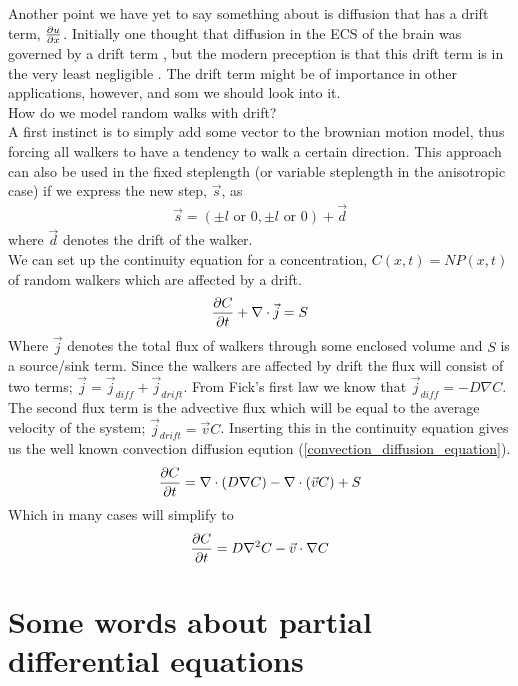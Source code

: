 Another point we have yet to say something about is diffusion that has a drift term, $\frac{\partial u}{\partial x}$. 
Initially one thought that diffusion in the ECS of the brain was governed by a drift term , but the modern preception is that this drift term is in the very least negligible \cite{nicholson2001diffusion}.
The drift term might be of importance in other applications, however, and som we should look into it.\\
How do we model random walks with drift? \\
A first instinct is to simply add some vector to the brownian motion model, thus forcing all walkers to have a tendency to walk a certain direction. 
This approach can also be used in the fixed steplength (or variable steplength in the anisotropic case)  if we express the new step, $\vec{s}$, as
\begin{align*}
 \vec{s} = (\pm l \text{ or }0,\pm l \text{ or }0) +\vec{d}
\end{align*}
where $\vec{d}$ denotes the drift of the walker.\\
We can set up the continuity equation for a concentration, $C(x,t) = NP(x,t)$ of random walkers which are affected by a drift.
\begin{equation}
 \frac{\partial C}{\partial t} +\nabla\cdot\vec{j} = S
\end{equation}
Where $\vec{j}$ denotes the total flux of walkers through some enclosed volume and $S$ is a source/sink term. 
Since the walkers are affected by drift the flux will consist of two terms; $\vec{j} = \vec{j}_{diff}+\vec{j}_{drift}$. 
From Fick's first law we know that $\vec{j}_{diff} = -D\nabla C$. 
The second flux term is the advective flux which will be equal to the average velocity of the system; $\vec{j}_{drift} = \vec{v}C$. 
Inserting this in the continuity equation gives us the well known convection diffusion eqution (\ref{convection_diffusion_equation}).
\begin{equation}\label{convection_diffusion_equation}
 \frac{\partial C}{\partial t} = \nabla\cdot\left(D\nabla C\right)-\nabla\cdot\left(\vec{v}C\right) + S
\end{equation}
Which in many cases will simplify to
\begin{equation}
 \frac{\partial C}{\partial t} = D\nabla^2 C-\vec{v}\cdot\nabla C
\end{equation}



\section{Some words about partial differential equations}\label{some_words_on_PDEs}
